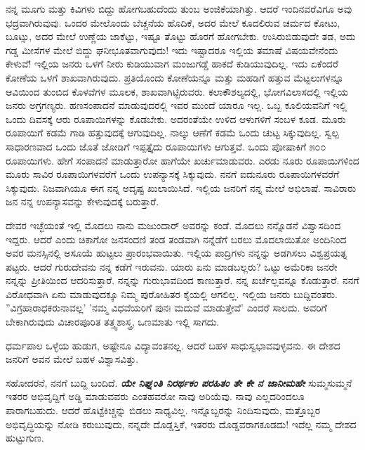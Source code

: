 ನನ್ನ ಮೂಗು ಮತ್ತು ಕಿವಿಗಳು ಬಿದ್ದು ಹೋಗಬಹುದೆಂದು ತುಂಬ ಅಂಜಿಕೆಯಾಗಿತ್ತು. ಆದರೆ ಇಂದಿನವರೆವಿಗೂ ಅವು ಭದ್ರವಾಗಿರುವುವು. ಒಂದರ ಮೇಲೊಂದು ಬೆಚ್ಚನೆಯ ಹೊದಿಕೆ, ಅದರ ಮೇಲೆ ಕೂದಲಿರುವ ಚರ್ಮದ ಕೋಟು, ಬೂಟ್ಸು, ಅದರ ಮೇಲೆ ಉಣ್ಣೆಯ ಜಾಕೆಟ್ಟು, ಇಷ್ಟೂ ತೊಟ್ಟು ಹೊರಗೆ ಹೋಗಬೇಕು. ಉಸಿರುಬಿಡುವುದೇ ತಡ, ಅದು ಗಡ್ಡ ಮೀಸೆಗಳ ಮೇಲೆ ಬಿದ್ದು ಘನೀಭೂತವಾಗುವುದು! ಇದು ಇಷ್ಟಾದರೂ ಇಲ್ಲಿಯ ತಮಾಷೆ ವಿಷಯವೇನೆಂದು ಕೇಳುವೆ! ಇಲ್ಲಿಯ ಜನರು ಒಳಗೆ ನೀರು ಕುಡಿಯುವಾಗ ಮಂಜುಗಡ್ಡೆ ಹಾಕದೆ ಕುಡಿಯುವುದಿಲ್ಲ. ಇದು ಏಕೆಂದರೆ ಕೋಣೆಯ ಒಳಗೆ ಶಾಖವಾಗಿರುವುದು. ಪ್ರತಿಯೊಂದು ಕೋಣೆಯನ್ನೂ ಮತ್ತು ಮಹಡಿಗೆ ಹತ್ತುವ ಮೆಟ್ಟಲುಗಳನ್ನೂ ಆವಿಯಿಂದ ತುಂಬಿದ ಕೊಳವೆಗಳ ಮೂಲಕ, ಶಾಖವಾಗಿಟ್ಟಿರುವರು. ಕಲಾಕೌಶಲ್ಯದಲ್ಲಿ, ಭೋಗವಿಲಾಸದಲ್ಲಿ ಇಲ್ಲಿಯ ಜನರು ಅಗ್ರಗಣ್ಯರು. ಹಣಸಂಪಾದನೆ ಮಾಡುವುದರಲ್ಲಿ ಇವರ ಮುಂದೆ ಯಾರೂ ಇಲ್ಲ. ಒಬ್ಬ ಕೂಲಿಯವನಿಗೆ ಇಲ್ಲಿ ಒಂದು ದಿವಸಕ್ಕೆ ಆರು ರೂಪಾಯಿಗಳನ್ನು ಕೊಡಬೇಕು. ಅದರಂತೆಯೇ ಉಳಿದ ಆಳುಗಳಿಗೆ ಸಂಬಳ ಕೂಡ. ಮೂರು ರೂಪಾಯಿಗೆ ಕಡಮೆ ಗಾಡಿ ಹತ್ತುವುದಕ್ಕೆ ಆಗುವುದಿಲ್ಲ. ನಾಲ್ಕು ಆಣೆಗೆ ಕಡಮೆ ಒಂದು ಚುಟ್ಟ ಸಿಕ್ಕುವುದಿಲ್ಲ. ಸ್ವಲ್ಪ ಸಾಧಾರಣವಾದ ಒಂದು ಜೊತೆ ಜೋಡಿಗೆ ಇಪ್ಪತ್ತೈದು ರೂಪಾಯಿಗಳು ಆಗುತ್ತವೆ. ಒಂದು ಪೋಷಾಕಿಗೆ ೫೦೦ ರೂಪಾಯಿಗಳು. ಹೇಗೆ ಸಂಪಾದನೆ ಮಾಡುತ್ತಾರೋ ಹಾಗೆಯೇ ಖರ್ಚುಮಾಡುವರು. ಎರಡು ನೂರು ರೂಪಾಯಿಗಳಿಂದ ಮೂರು ಸಾವಿರ ರೂಪಾಯಿಗಳವರೆಗೆ ಒಂದು ಉಪನ್ಯಾಸಕ್ಕೆ ಸಿಕ್ಕುವುದು. ನನಗೆ ಐದುನೂರು ರೂಪಾಯಿಗಳವರೆಗೆ ಸಿಕ್ಕುವುದು. ನಿಜವಾಗಿಯೂ ಈಗ ನನ್ನ ಅದೃಷ್ಟ ಖುಲಾಯಿಸಿದೆ. ಇಲ್ಲಿಯ ಜನರಿಗೆ ನನ್ನ ಮೇಲೆ ಅಭಿಲಾಷೆ. ಸಾವಿರಾರು ಜನ ನನ್ನ ಉಪನ್ಯಾಸವನ್ನು ಕೇಳುವುದಕ್ಕೆ ಬರುತ್ತಾರೆ.

ದೇವರ ಇಚ್ಛೆಯಂತೆ ಇಲ್ಲಿ ಮೊದಲು ನಾನು ಮಜುಂದಾರ್ ಅವರನ್ನು ಕಂಡೆ. ಮೊದಲು ನನ್ನೊಡನೆ ವಿಶ್ವಾಸದಿಂದ ಇದ್ದರು. ಆದರೆ ಎಂದು ಚಿಕಾಗೋ ಜನಸಂದಣಿ ತಂಡ ತಂಡವಾಗಿ ನನ್ನೆಡೆಗೆ ಬರಲು ಮೊದಲಾಯಿತೋ ಅಂದಿನಿಂದ ಅವರ ಮನಸ್ಸಿನಲ್ಲಿ ಅಸೂಯೆ ಹುಟ್ಟಲು ಪ್ರಾರಂಭವಾಯಿತು. ಇಲ್ಲಿಯ ಪಾದ್ರಿಗಳು ನನ್ನನ್ನು ಅಡಗಿಸಲು ವಿಶ್ವಪ್ರಯತ್ನ ಪಟ್ಟರು. ಆದರೆ ಗುರುದೇವನು ನನ್ನ ಕಡೆಗೆ ಇರುವನು. ಯಾರು ಏನು ಮಾಡಬಲ್ಲರು? ಒಟ್ಟು ಅಮೆರಿಕಾ ಜನರೇ ನನ್ನನ್ನು ಪ್ರೀತಿಯಿಂದ ಆದರಿಸುತ್ತಾರೆ. ನನ್ನನ್ನು ಗುರುಭಾವದಿಂದ ಕಾಣುತ್ತಾರೆ. ನನ್ನ ಖರ್ಚೆಲ್ಲವನ್ನೂ ಕೊಡುತ್ತಾರೆ. ನನಗೆ ವಿರೋಧವಾಗಿ ಏನು ಮಾಡುವುದಕ್ಕೂ ನಿಮ್ಮ ಪುರೋಹಿತರ ಕೈಯಲ್ಲಿ ಆಗಲಿಲ್ಲ. ಇಲ್ಲಿಯ ಜನರು ಬುದ್ದಿವಂತರು. ''ವಿಗ್ರಹಾರಾಧಕರುನಾವಲ್ಲ' 'ನಮ್ಮ ವಿಧವೆಯರಿಗೆ ಪುನಃ ಮದುವೆ ಮಾಡುತ್ತೇವೆ' ಎಂದರೆ ಸಾಲದು. ಅವರಿಗೆ ಬೇಕಾಗಿರುವುದು ವಿಚಾರಪೂರಿತ ತತ್ತ್ವಶಾಸ್ತ್ರ, ಒಣಮಾತು ಇಲ್ಲಿ ಸಾಗದು.

ಧರ್ಮಪಾಲ ಒಳ್ಳೆಯ ಹುಡುಗ, ಅಷ್ಟೇನೂ ವಿದ್ಯಾವಂತನಲ್ಲ. ಆದರೆ ಬಹಳ ಸಾಧುಸ್ವಭಾವವುಳ್ಳವನು. ಈ ದೇಶದ ಜನರಿಗೆ ಅವನ ಮೇಲೆ ಬಹಳ ವಿಶ್ವಾಸವಿತ್ತು.

ಸಹೋದರನೆ, ನನಗೆ ಬುದ್ದಿ ಬಂದಿದೆ. \textbf{\textit{ಯೇ ನಿಘ್ನಂತಿ ನಿರರ್ಥಕಂ ಪರಹಿತಂ ತೇ ಕೇ ನ ಜಾನೀಮಹೇ}} ಸುಮ್ಮಸುಮ್ಮನೆ ಇತರರ ಅಭಿವೃದ್ದಿಗೆ ಅಡ್ಡಿ ಮಾಡುವವರು ಎಂತಹವರೋ ನಾವು ಅರಿಯೆವು. ನಾವು ಎಲ್ಲದರಿಂದಲೂ ಪಾರಾಗಬಹುದು. ಆದರೆ ಹೊಟ್ಟೆಕಿಚ್ಚನ್ನು ಬಿಡಲು ಸಾಧ್ಯವಿಲ್ಲ. ಇನ್ನೊಬ್ಬರನ್ನು ನಿಂದಿಸುವುದು, ಮತ್ತೊಬ್ಬರ ಅಭಿವೃದ್ಧಿಯನ್ನು ನೋಡಿ ಕರುಬುವುದು, ನನ್ನದೇ ದೊಡ್ಡಸ್ತಿಕೆ, ಇತರರು ದೊಡ್ಡವರಾಗಕೂಡದು! ಇದೆಲ್ಲ ನಮ್ಮ ದೇಶದ ಹುಟ್ಟುಗುಣ.

